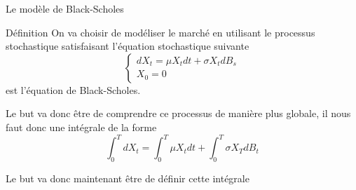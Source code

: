 \documentclass{beamer}
\newcommand{\1}{\mathmybb{1}}
\begin{document}
\begin{frame}{Le modèle de Black-Scholes}
  \begin{block}{Définition}
    On va choisir de modéliser le marché en utilisant le processus stochastique satisfaisant l'équation stochastique suivante
    \begin{equation}
      \begin{cases}
        dX_{t} = \mu X_{t} dt + \sigma X_{t} dB_{s} \\
        X_{0} = 0
      \end{cases}
      \end{equation}
      est l'équation de Black-Scholes. \\
    \end{block}
    \pause
    \begin{alertblock}{}
    Le but va donc être de comprendre ce processus de manière plus globale, il nous faut donc une intégrale de la forme
    \[
      \int_0^{T} dX_{t} = \int_0^{T} \mu X_{t} dt + \int_{0}^{T} \sigma X_{T} dB_{t}
    \]
  \end{alertblock}
  \pause
  Le but va donc maintenant être de définir cette intégrale
\end{frame}
\end{document}
